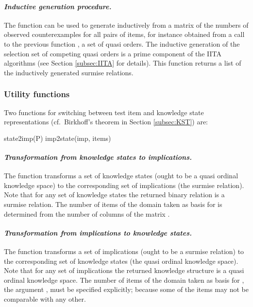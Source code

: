 \documentclass[nojss]{jss}
\begin{document}
\paragraph{\it Inductive generation procedure.}
The function  can be used to generate inductively from a matrix  
of the numbers of observed counterexamples for all pairs of items, for instance obtained 
from a call to the previous function , a set of quasi orders. The inductive generation of the selection set of competing quasi orders is a prime component of the 
IITA algorithms (see Section \ref{subsec:IITA} for details). This function returns a list of the 
inductively generated surmise relations.

\subsubsection{Utility functions}

Two functions for switching between test item and knowledge state representations
(cf.\ Birkhoff's theorem in Section \ref{subsec:KST}) are:
\begin{Code}
state2imp(P)
imp2state(imp, items)
\end{Code}

\paragraph{\it Transformation from knowledge states to implications.}
The function  transforms a set of knowledge states 
(ought to be a quasi ordinal knowledge space)  
to the corresponding set of implications (the surmise relation). Note that for any set of knowledge states the returned binary relation is a surmise relation.
The number of items of the domain taken as basis for  is determined from the number of columns of the matrix .

\paragraph{\it Transformation from implications to knowledge states.}
The function  transforms a set of implications (ought to be a surmise relation) 
 to the corresponding set of knowledge states (the quasi ordinal knowledge space).
Note that for any set of implications the returned knowledge structure is a quasi ordinal knowledge space.
The number of items of the domain taken as basis for , the argument , must be specified explicitly; because 
some of the items may not be comparable with any other.
\end{document}
